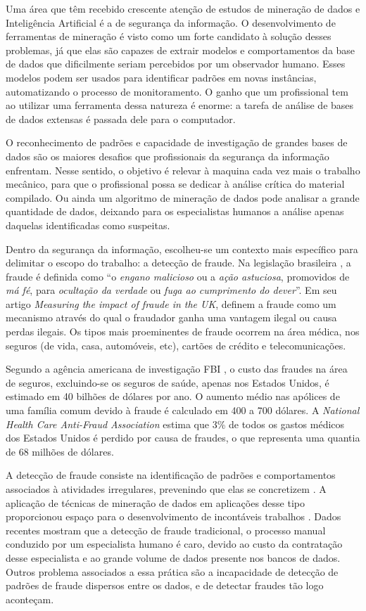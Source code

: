 Uma área que têm recebido crescente atenção de estudos de mineração de dados e Inteligência Artificial é a de segurança da informação. O desenvolvimento de ferramentas de mineração é visto como um forte candidato à solução desses problemas, já que elas são capazes de extrair modelos e comportamentos da base de dados que dificilmente seriam percebidos por um observador humano. Esses modelos podem ser usados para identificar padrões em novas instâncias, automatizando o processo de monitoramento. O ganho que um profissional tem ao utilizar uma ferramenta dessa natureza é enorme: a tarefa de análise de bases de dados extensas é passada dele para o computador.

O reconhecimento de padrões e capacidade de investigação de grandes bases de dados são os maiores desafios que profissionais da segurança da informação enfrentam. Nesse sentido, o objetivo é relevar à maquina cada vez mais o trabalho mecânico, para que o profissional possa se dedicar à análise crítica do material compilado. Ou ainda um algoritmo de mineração de dados pode analisar a grande quantidade de dados, deixando para os especialistas humanos a análise apenas daquelas identificadas como suspeitas.

Dentro da segurança da informação, escolheu-se um contexto mais específico para delimitar o escopo do trabalho: a detecção de fraude. Na legislação brasileira \cite[p. 324]{DePlacido1982}, a fraude é definida como ``o \emph{engano malicioso} ou a \emph{ação astuciosa}, promovidos de \emph{má fé}, para \emph{ocultação da verdade} ou \emph{fuga ao cumprimento do dever}''. Em seu artigo \emph{Measuring the impact of fraude in the UK}, \citet{Levi2008} definem a fraude como um mecanismo através do qual o fraudador ganha uma vantagem ilegal ou causa perdas ilegais. Os tipos mais proeminentes de fraude ocorrem na área médica, nos seguros (de vida, casa, automóveis, etc), cartões de crédito e telecomunicações.

Segundo a agência americana de investigação FBI \cite{FBI2010}, o custo das fraudes na área de seguros, excluindo-se os seguros de saúde, apenas nos Estados Unidos, é estimado em 40 bilhões de dólares por ano. O aumento médio nas apólices de uma família comum devido à fraude é calculado em 400 a 700 dólares. A \emph{National Health Care Anti-Fraud Association} estima que 3\% de todos os gastos médicos dos Estados Unidos é perdido por causa de fraudes, o que representa uma quantia de 68 milhões de dólares.

A detecção de fraude consiste na identificação de padrões e comportamentos associados à atividades irregulares, prevenindo que elas se concretizem \cite{Phua2010}. A aplicação de técnicas de mineração de dados em aplicações desse tipo proporcionou espaço para o desenvolvimento de incontáveis trabalhos \cite{Phua2010}. Dados recentes mostram que a detecção de fraude tradicional, o processo manual conduzido por um especialista humano é caro, devido ao custo da contratação desse especialista e ao grande volume de dados presente nos bancos de dados. Outros problema associados a essa prática são a incapacidade de detecção de padrões de fraude dispersos entre os dados, e de detectar fraudes tão logo aconteçam.


